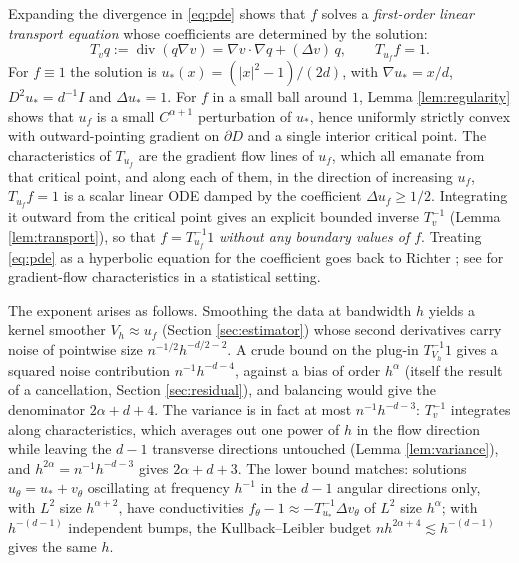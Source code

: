 \documentclass[11pt]{article}
\numberwithin{equation}{section}
\newcommand{\diver}{\operatorname{div}}
\begin{document}
Expanding the divergence in \eqref{eq:pde} shows that $f$ solves a
\emph{first-order linear transport equation} whose coefficients are
determined by the solution:
\begin{equation}\label{eq:transportdef}
 T_vq:=\diver(q\nabla v)=\nabla v\cdot\nabla q+(\Delta v)\,q,
 \qquad T_{u_f}f=1 .
\end{equation}
For $f\equiv1$ the solution is $u_*(x)=(|x|^2-1)/(2d)$, with
$\nabla u_*=x/d$, $D^2u_*=d^{-1}I$ and $\Delta u_*=1$. For $f$ in a
small ball around $1$, Lemma \ref{lem:regularity} shows that $u_f$ is
a small $C^{\alpha+1}$ perturbation of $u_*$, hence uniformly strictly
convex with outward-pointing gradient on $\partial D$ and a single
interior critical point. The characteristics of $T_{u_f}$ are the
gradient flow lines of $u_f$, which all emanate from that critical
point, and along each of them, in the direction of increasing $u_f$,
$T_{u_f}f=1$ is a scalar linear ODE damped by the coefficient
$\Delta u_f\ge1/2$. Integrating it outward from the critical point
gives an explicit bounded inverse $T_v^{-1}$ (Lemma
\ref{lem:transport}), so that $f=T_{u_f}^{-1}1$ \emph{without any
boundary values of $f$}. Treating \eqref{eq:pde} as a hyperbolic
equation for the coefficient goes back to Richter \cite{Richter}; see
\cite{KSV} for gradient-flow characteristics in a statistical setting.

The exponent arises as follows. Smoothing the data at bandwidth $h$
yields a kernel smoother $V_h\approx u_f$ (Section
\ref{sec:estimator}) whose second derivatives carry noise of
pointwise size $n^{-1/2}h^{-d/2-2}$. A crude bound on the
plug-in $T_{V_h}^{-1}1$ gives a squared noise contribution
$n^{-1}h^{-d-4}$, against a bias of order $h^\alpha$ (itself the result
of a cancellation, Section \ref{sec:residual}), and balancing would
give the denominator $2\alpha+d+4$. The variance is in fact at most
$n^{-1}h^{-d-3}$: $T_v^{-1}$ integrates along characteristics, which
averages out one power of $h$ in the flow direction while leaving the
$d-1$ transverse directions untouched (Lemma \ref{lem:variance}), and
$h^{2\alpha}=n^{-1}h^{-d-3}$ gives $2\alpha+d+3$. The lower bound
matches: solutions $u_\theta=u_*+v_\theta$ oscillating at frequency
$h^{-1}$ in the $d-1$ angular directions only, with $L^2$ size
$h^{\alpha+2}$, have conductivities
$f_\theta-1\approx-T_{u_*}^{-1}\Delta v_\theta$ of $L^2$ size
$h^\alpha$; with $h^{-(d-1)}$ independent bumps, the Kullback--Leibler
budget $nh^{2\alpha+4}\lesssim h^{-(d-1)}$ gives the same $h$.
\end{document}
